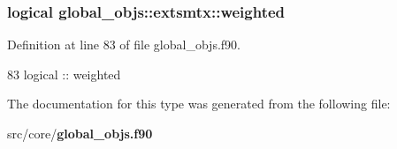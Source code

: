 \subsubsection[{weighted}]{\setlength{\rightskip}{0pt plus 5cm}logical global\+\_\+objs\+::extsmtx\+::weighted}\label{structglobal__objs_1_1extsmtx_ac3144c632e3c6a5ac564569c91464aff}


Definition at line 83 of file global\+\_\+objs.\+f90.


\begin{DoxyCode}
83     \textcolor{keywordtype}{logical} :: weighted
\end{DoxyCode}


The documentation for this type was generated from the following file\+:\begin{DoxyCompactItemize}
\item 
src/core/{\bf global\+\_\+objs.\+f90}\end{DoxyCompactItemize}
